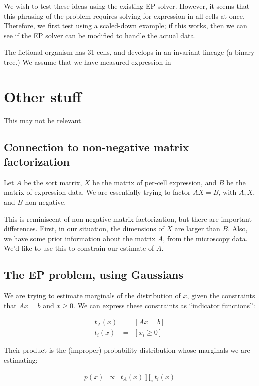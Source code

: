 \documentclass{article}
\begin{document}
We wish to test these ideas using the existing EP solver. However, it
seems that this phrasing of the problem requires solving for expression
in all cells at once. Therefore, we first test using a scaled-down example;
if this works, then we can see if the EP solver can be modified to handle
the actual data.

The fictional organism has 31 cells, and develops in an invariant lineage
(a binary tree.) We assume that we have measured expression in






\section{Other stuff}

This may not be relevant.

\subsection{Connection to non-negative matrix factorization}

Let $A$ be the sort matrix, $X$ be the matrix of per-cell expression, and
$B$ be the matrix of expression data. We are essentially trying to factor
$AX=B$, with $A, X$, and $B$ non-negative.

This is reminiscent of non-negative matrix factorization, but
there are important differences. First, in our situation,
the dimensions of $X$ are larger than $B$. Also, we have some
prior information about
the matrix $A$, from the microscopy data.
We'd like to use this to constrain our estimate of $A$.

\subsection{The EP problem, using Gaussians}

We are trying to estimate marginals of the distribution of $x$, given the
constraints that $Ax = b$ and $x \ge 0$. We can express these constraints
as ``indicator functions'':

\begin{eqnarray}
t_A(x) & = & [Ax = b] \\
t_i(x) & = & [x_i \ge 0]
\end{eqnarray}

Their product is the (improper) probability distribution whose marginals
we are estimating:

\begin{eqnarray}
p(x) & \propto & t_A(x) \prod_i t_i(x)
\end{eqnarray}
\end{document}
